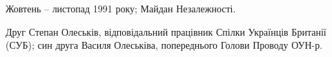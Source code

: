  
 
 
 
 


Жовтень – листопад 1991 року; Майдан Незалежності.

Друг Степан Олеськів, відповідальний працівник Спілки Українців Британії (СУБ);
син друга Василя Олеськіва, попереднього Голови Проводу ОУН-р.
